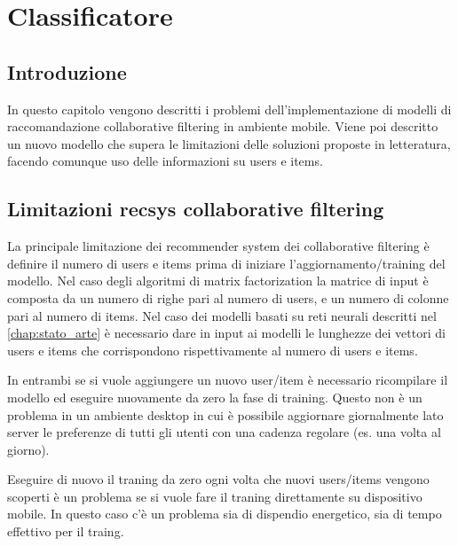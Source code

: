 \documentclass[12pt,italian]{report}
\begin{document}
% 
% 

\chapter{Classificatore}
\label{chap:classificatore}

\section{Introduzione}
In questo capitolo vengono descritti i problemi dell'implementazione di modelli di raccomandazione collaborative filtering in ambiente mobile. Viene poi descritto un nuovo modello che supera le limitazioni delle soluzioni proposte in letteratura, facendo comunque uso delle informazioni su users e items.

\section{Limitazioni recsys collaborative filtering}
La principale limitazione dei recommender system dei collaborative filtering è definire il numero di users e items prima di iniziare l'aggiornamento/training del modello. Nel caso degli algoritmi di matrix factorization la matrice di input è composta da un numero di righe pari al numero di users, e un numero di colonne pari al numero di items. Nel caso dei modelli basati su reti neurali descritti nel \autoref{chap:stato_arte} è necessario dare in input ai modelli le lunghezze dei vettori di users e items che corrispondono rispettivamente al numero di users e items.

In entrambi se si vuole aggiungere un nuovo user/item è necessario ricompilare il modello ed eseguire nuovamente da zero la fase di training. Questo non è un problema in un ambiente desktop in cui è possibile aggiornare giornalmente lato server le preferenze di tutti gli utenti con una cadenza regolare (es. una volta al giorno).

Eseguire di nuovo il traning da zero ogni volta che nuovi users/items vengono scoperti è un problema se si vuole fare il traning direttamente su dispositivo mobile. In questo caso c'è un problema sia di dispendio energetico, sia di tempo effettivo per il traing.
\end{document}
